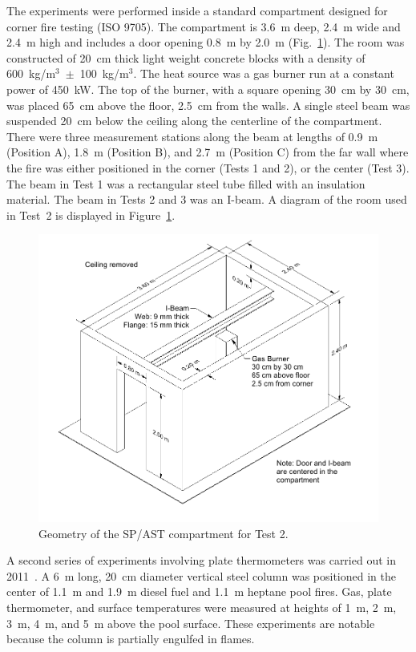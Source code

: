 The experiments were performed inside a standard compartment designed for corner fire testing (ISO 9705). The compartment is 3.6~m deep, 2.4~m wide and 2.4~m high and includes a door opening 0.8~m by 2.0~m (Fig.~\ref{Room_Drawing}). The room was constructed of 20~cm thick light weight concrete blocks with a density of 600~kg/m$^3$~$\pm$~100~kg/m$^3$. The heat source was a gas burner run at a constant power of 450~kW. The top of the burner, with a square opening 30~cm by 30~cm, was placed 65~cm above the floor, 2.5~cm from the walls. A single steel beam was suspended 20~cm below the ceiling along the centerline of the compartment. There were three measurement stations along the beam at lengths of 0.9~m (Position A), 1.8~m (Position B), and 2.7~m (Position C) from the far wall where the fire was either positioned in the corner (Tests 1 and 2), or the center (Test 3). The beam in Test 1 was a rectangular steel tube filled with an insulation material. The beam in Tests 2 and 3 was an I-beam. A diagram of the room used in Test~2 is displayed in Figure~\ref{Room_Drawing}.

\begin{figure}[!ht]
\includegraphics[width=\textwidth]{FIGURES/SP_AST/SP_AST_Compartment_Drawing}
\caption[Geometry of the  SP/AST compartment for Test 2]{Geometry of the  SP/AST compartment for Test 2.}
\label{Room_Drawing}
\end{figure}

A second series of experiments involving plate thermometers was carried out in 2011~\cite{Sjostrom:AST}. A 6~m long, 20~cm diameter vertical steel column was positioned in the center of 1.1~m and 1.9~m diesel fuel and 1.1~m heptane pool fires. Gas, plate thermometer, and surface temperatures were measured at heights of 1~m, 2~m, 3~m, 4~m, and 5~m above the pool surface. These experiments are notable because the column is partially engulfed in flames.

